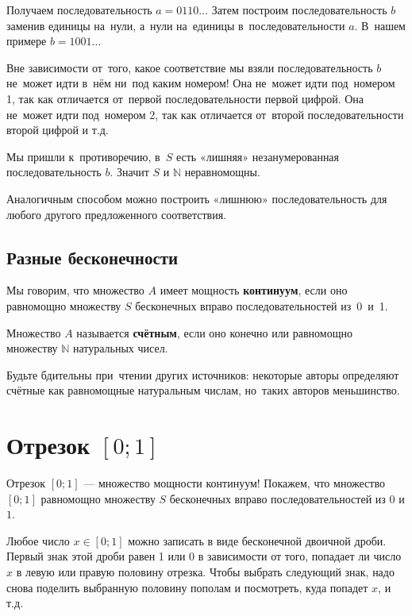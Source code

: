 \documentclass[12pt, a4paper]{article}
\begin{document}
Получаем последовательность $a=0110\ldots$ Затем построим последовательность $b$ заменив единицы на~нули, а~нули на~единицы в~последовательности $a$. В~нашем примере $b=1001\ldots $

Вне зависимости от~того, какое соответствие мы взяли  последовательность $b$ не~может идти в~нём ни~под каким номером! Она не~может идти под~номером 1, так как отличается от~первой последовательности первой цифрой. Она не~может идти под~номером 2, так как отличается от~второй последовательности второй цифрой и т.д.

Мы пришли к~противоречию, в~$S$ есть «лишняя» незанумерованная последовательность $b$. Значит $S$ и $\mathbb{N}$ неравномощны.

Аналогичным способом можно построить «лишнюю» последовательность для любого другого предложенного соответствия.

\subsection{Разные бесконечности}

Мы говорим, что множество $A$ имеет мощность \textbf{континуум}, если оно равномощно множеству $S$ бесконечных вправо последовательностей из~0~и~1.


Множество $A$ называется \textbf{счётным}, если оно конечно или равномощно множеству $\mathbb{N}$ натуральных чисел.

Будьте бдительны при~чтении других источников: некоторые авторы определяют счётные как равномощные натуральным числам, но~таких авторов меньшинство.

\section{Отрезок $ [0;1] $}

Отрезок $[0;1]$ --- множество мощности континуум!
Покажем, что множество $[0;1]$ равномощно множеству $S$ бесконечных вправо последовательностей из $0$ и $1$.

Любое число $x \in [0;1]$ можно записать в виде бесконечной двоичной дроби. Первый знак этой дроби равен 1 или 0 в зависимости от того, попадает ли число $x$ в левую или правую половину отрезка. Чтобы выбрать следующий знак, надо снова поделить выбранную половину пополам и посмотреть, куда попадет $x$, и т.д.
\end{document}
